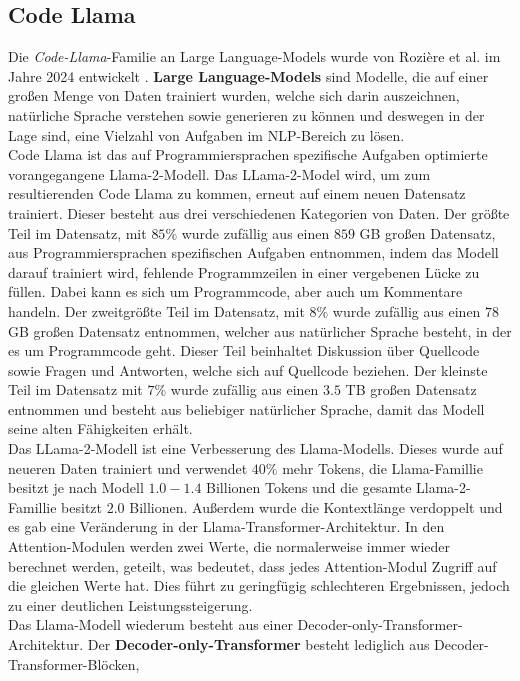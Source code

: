 \documentclass[12pt,letterpaper,ngerman]{article}
\begin{document}
\subsection{Code Llama}
Die \textit{Code-Llama}-Familie an Large Language-Models wurde von 
Rozière et al. im Jahre 2024 entwickelt
\cite{rozière2024codellamaopenfoundation}.
{\bf Large Language-Models} sind Modelle, die auf
einer großen Menge von Daten trainiert wurden, welche sich darin
auszeichnen, natürliche Sprache verstehen sowie generieren zu
können und deswegen in der Lage sind, eine Vielzahl von Aufgaben
im NLP-Bereich zu lösen.\\
Code Llama ist das auf Programmiersprachen 
spezifische Aufgaben optimierte vorangegangene Llama-2-Modell.
Das LLama-2-Model wird,
um zum resultierenden Code Llama zu kommen, erneut auf einem neuen
Datensatz trainiert. Dieser besteht aus drei verschiedenen 
Kategorien von Daten. Der größte Teil im Datensatz,
mit $85 \%$ wurde zufällig aus einen $859$ GB großen Datensatz,
aus Programmiersprachen spezifischen Aufgaben entnommen,
indem das Modell darauf trainiert wird, fehlende Programmzeilen in 
einer vergebenen Lücke zu füllen. Dabei kann es sich um Programmcode,
aber auch um Kommentare handeln. Der zweitgrößte Teil im Datensatz,
mit $8 \%$ wurde zufällig aus einen $78$ GB großen Datensatz entnommen,
welcher aus natürlicher Sprache besteht, in der es um 
Programmcode geht. Dieser Teil beinhaltet Diskussion über Quellcode
sowie Fragen und Antworten, welche sich auf Quellcode beziehen. 
Der kleinste Teil im Datensatz mit $7 \%$ wurde zufällig aus einen 
$3.5$ TB großen Datensatz entnommen und
besteht aus beliebiger natürlicher Sprache, damit das Modell
seine alten Fähigkeiten erhält.\\
Das LLama-2-Modell ist eine Verbesserung des Llama-Modells.
Dieses wurde auf neueren Daten trainiert und verwendet 
$40 \%$ mehr Tokens, die Llama-Famillie besitzt je nach Modell
$1.0-1.4$ Billionen Tokens und die gesamte Llama-2-Famillie 
besitzt $2.0$ Billionen.
Außerdem wurde die Kontextlänge verdoppelt und
es gab eine Veränderung in der Llama-Transformer-Architektur. 
In den Attention-Modulen werden zwei Werte, die normalerweise 
immer wieder berechnet werden, geteilt, was bedeutet, dass 
jedes Attention-Modul Zugriff auf die gleichen Werte hat.
Dies führt zu geringfügig schlechteren Ergebnissen, jedoch zu
einer deutlichen Leistungssteigerung.\\
Das Llama-Modell wiederum besteht aus einer Decoder-only-Transformer-Architektur.
Der {\bf Decoder-only-Transformer}
besteht lediglich aus Decoder-Transformer-Blöcken,
\end{document}

